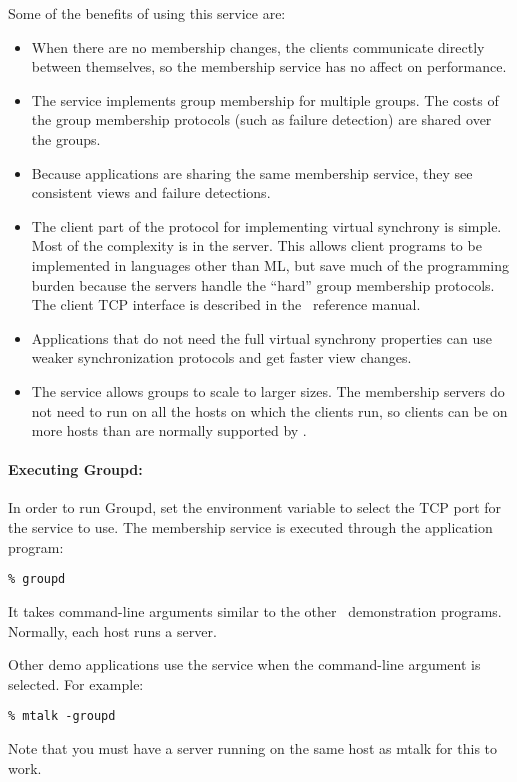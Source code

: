 Some of the benefits of using this service are:
\begin{itemize}
\item
When there are no membership changes, the clients communicate directly between
themselves, so the membership service has no affect on performance.
\item
The service implements group membership for multiple groups.  The costs of the
group membership protocols (such as failure detection) are shared over the
groups.
\item
Because applications are sharing the same membership service, they see
consistent views and failure detections.
\item
The client part of the protocol for implementing virtual synchrony is simple.
Most of the complexity is in the server.  This allows client programs to be
implemented in languages other than ML, but save much of the programming burden
because the servers handle the ``hard'' group membership protocols.  The client
TCP interface is described in the \ensemble\ reference manual.
\item
Applications that do not need the full virtual synchrony properties can use
weaker synchronization protocols and get faster view changes.
\item
The service allows groups to scale to larger sizes.  The membership servers do
not need to run on all the hosts on which the clients run, so clients can be on
more hosts than are normally supported by \ensemble.
\end{itemize}

\paragraph{Executing Groupd:}
In order to run Groupd, set the  environment
variable to select the TCP port for the service to use.  The membership service
is executed through the  application program:
\begin{verbatim}
% groupd
\end{verbatim}
It takes command-line arguments similar to the other \ensemble\ demonstration
programs.  Normally, each host runs a server.

Other demo applications use the service when the  command-line
argument is selected.  For example:
\begin{verbatim}
% mtalk -groupd
\end{verbatim}
Note that you must have a  server running on the same host as
mtalk for this to work.


